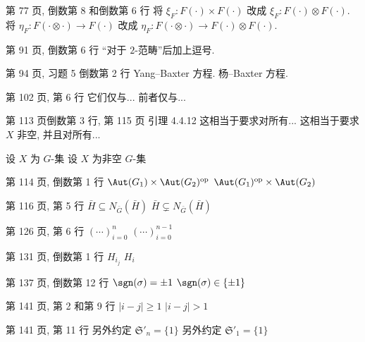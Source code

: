 \documentclass{AJerrata}
\begin{document}
\begin{Errata}
		\item[第 77 页, 倒数第 8 和倒数第 6 行]
		将 $\xi_F: F(\cdot) \times F(\cdot)$ 改成 $\xi_F: F(\cdot) \otimes F(\cdot)$. 将 $\eta_F: F(\cdot \otimes \cdot) \to F(\cdot)$ 改成 $\eta_F: F(\cdot \otimes \cdot) \to F(\cdot) \otimes F(\cdot)$.

		\item[第 91 页, 倒数第 6 行]
		``对于 $2$-范畴''后加上逗号.

        \item[第 94 页, 习题 5 倒数第 2 行]
        \Orig Yang--Baxter 方程.
        \Corr 杨--Baxter 方程.
        
       	\item[第 102 页, 第 6 行]
        \Orig 它们仅与...
        \Corr 前者仅与...
        
        \item[第 113 页倒数第 3 行, 第 115 页 引理 4.4.12]
        \Orig 这相当于要求对所有...
        \newline
        \Corr 这相当于要求 $X$ 非空, 并且对所有...
        
        \Orig 设 $X$ 为 $G$-集
        \Corr 设 $X$ 为非空 $G$-集
        
        \item[第 114 页, 倒数第 1 行]
        \Orig $\Aut(G_1) \times \Aut(G_2)^{\mathrm{op}}$
        \Corr $\Aut(G_1)^{\mathrm{op}} \times \Aut(G_2)$
        
        \item[第 116 页, 第 5 行]
        \Orig $\bar{H} \subseteq N_{\bar{G}}(\bar{H})$
        \Corr $\bar{H} \subsetneq N_{\bar{G}}(\bar{H})$

		\item[第 126 页, 第 6 行]
		\Orig $\left( \cdots \right)_{i=0}^n$
		\Corr $\left( \cdots \right)_{i=0}^{n-1}$
		
		\item[第 131 页, 倒数第 1 行]
		\Orig $H_{i_j}$
		\Corr $H_i$

		\item[第 137 页, 倒数第 12 行]
		\Orig $\sgn(\sigma) = \pm 1$
		\Corr $\sgn(\sigma) \in \{\pm 1\}$

		\item[第 141 页, 第 2 和第 9 行]
		\Orig $|i - j| \geq 1$
		\Corr $|i - j| > 1$

        \item[第 141 页, 第 11 行]
        \Orig 另外约定 $\mathfrak{S}'_n = \{1\}$
        \Corr 另外约定 $\mathfrak{S}'_1 = \{1\}$


\end{Errata}
\end{document}
